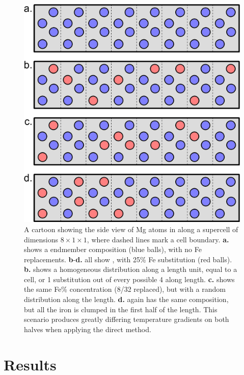 \begin{figure}[h!]
  \includegraphics[width=\linewidth]{Figures/substitution_05-collated.png}
  \caption[CONTENTS BIT]{A cartoon showing the side view of Mg atoms in \mgsios along a supercell of dimensions $8\times1\times1$, where dashed lines mark a cell boundary. \textbf{a.} shows a \mgsios endmember composition (blue balls), with no Fe replacements. \textbf{b}-\textbf{d.} all show \mgfesio, with 25\% Fe substitution (red balls). \textbf{b.} shows a homogeneous distribution along a length unit, equal to a cell, or 1 substitution out of every possible 4 along length. \textbf{c.} shows the same Fe\% concentration (8/32 replaced), but with a random distribution along the length. \textbf{d.} again has the same composition, but all the iron is clumped in the first half of the length. This scenario produces greatly differing temperature gradients on both halves when applying the direct method.}
  \label{fig:substitutions}
\end{figure}



\section{Results}

